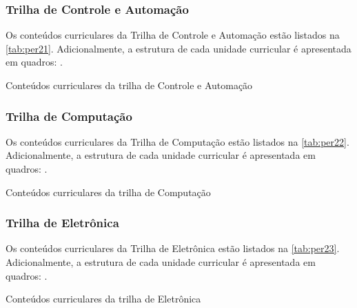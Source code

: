 \subsubsection{Trilha de Controle e Automação}

Os conteúdos curriculares da Trilha de Controle e Automação estão listados na \autoref{tab:per21}. Adicionalmente, a estrutura de cada unidade curricular é apresentada em quadros: .

\begin{table}[!htb]
	\centering\footnotesize
	\caption{Conteúdos curriculares da trilha de Controle e Automação}
	\label{tab:per21}
\end{table}

\clearpage

\subsubsection{Trilha de Computação}

Os conteúdos curriculares da Trilha de Computação estão listados na \autoref{tab:per22}. Adicionalmente, a estrutura de cada unidade curricular é apresentada em quadros: .

\begin{table}[!htb]
	\centering\footnotesize
	\caption{Conteúdos curriculares da trilha de Computação}
	\label{tab:per22}
\end{table}

\clearpage

\subsubsection{Trilha de Eletrônica}

Os conteúdos curriculares da Trilha de Eletrônica estão listados na \autoref{tab:per23}. Adicionalmente, a estrutura de cada unidade curricular é apresentada em quadros: .

\begin{table}[!htb]
	\centering\footnotesize
	\caption{Conteúdos curriculares da trilha de Eletrônica}
	\label{tab:per23}
\end{table}

